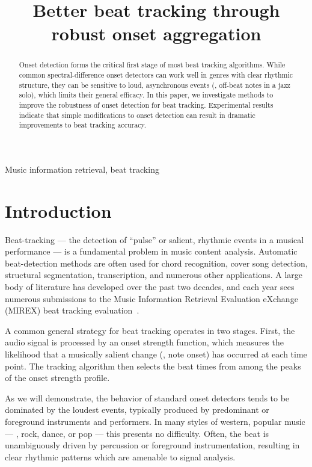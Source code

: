 \documentclass{article}
\title{Better beat tracking through robust onset aggregation}
\begin{document}
%
\maketitle
%
\begin{abstract}
Onset detection forms the critical first stage of most beat tracking algorithms.
While common spectral-difference onset detectors can work well in genres with clear 
rhythmic structure, they can be sensitive to loud, asynchronous events (\eg, off-beat 
notes in a jazz solo), which limits their general efficacy. In this paper, we investigate 
methods to improve the robustness of onset detection for beat tracking. 
Experimental results indicate that simple modifications to onset detection can result
in dramatic improvements to beat tracking accuracy.
\end{abstract}
%
\begin{keywords}
Music information retrieval, beat tracking
\end{keywords}
%
\section{Introduction}
\label{sec:intro}
Beat-tracking --- the detection of ``pulse'' or salient, rhythmic events in a musical 
performance --- is a fundamental problem in music content analysis. Automatic 
beat-detection methods are often used for chord recognition, cover song detection, 
structural segmentation, transcription, and numerous other applications. A large body of 
literature has developed over the past two decades, and each year sees numerous 
submissions to the Music Information Retrieval Evaluation eXchange (MIREX) beat tracking 
evaluation~\cite{Downie2008}.

A common general strategy for beat tracking operates in two stages.  First, the 
audio signal is processed by an onset strength function, which measures the likelihood 
that a musically salient change (\eg, note onset) has occurred at each time point.  
The tracking algorithm then selects the beat times from among the peaks of the onset 
strength profile.

As we will demonstrate, the behavior of standard onset detectors tends to be dominated by 
the loudest events, typically produced by predominant or foreground instruments and 
performers.  In many styles of western, popular music --- \eg, rock, dance, or pop --- 
this presents no difficulty. Often, the beat is unambiguously driven by percussion or 
foreground instrumentation, resulting in clear rhythmic patterns which are amenable 
to signal analysis. 
\end{document}
